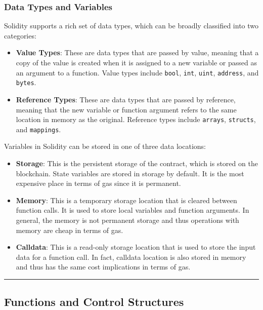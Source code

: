 \subsubsection{Data Types and
	Variables}\label{data-types-and-variables}

Solidity supports a rich set of data types, which can be broadly
classified into two categories:

\begin{itemize}
	\tightlist
	\item
	\textbf{Value Types}: These are data types that are passed by value,
	meaning that a copy of the value is created when it is assigned to a
	new variable or passed as an argument to a function. Value types
	include \texttt{bool}, \texttt{int}, \texttt{uint}, \texttt{address},
	and \texttt{bytes}.
	\item
	\textbf{Reference Types}: These are data types that are passed by
	reference, meaning that the new variable or function argument refers
	to the same location in memory as the original. Reference types
	include \texttt{arrays}, \texttt{structs}, and \texttt{mappings}.
\end{itemize}

Variables in Solidity can be stored in one of three data locations:

\begin{itemize}
	\tightlist
	\item
	\textbf{Storage}: This is the persistent storage of the contract,
	which is stored on the blockchain. State variables are stored in
	storage by default. It is the most expensive place in terms of gas since it is permanent.
	\item
	\textbf{Memory}: This is a temporary storage location that is cleared
	between function calls. It is used to store local variables and
	function arguments. In general, the memory is not permanent storage and thus operations with memory are cheap in terms of gas.
	\item
	\textbf{Calldata}: This is a read-only storage location that is used
	to store the input data for a function call. In fact, calldata location is also stored in memory and thus has the same cost implications in terms of gas.
\end{itemize}

\begin{center}\rule{0.5\linewidth}{0.5pt}\end{center}

\subsection{Functions and Control
	Structures}\label{section-2-functions-and-control-structures}

